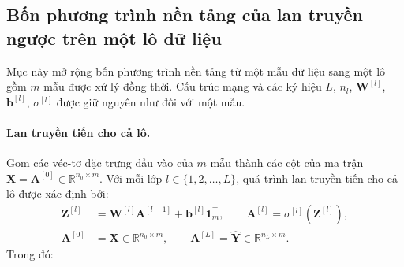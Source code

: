 \subsection{Bốn phương trình nền tảng của lan truyền ngược trên một lô dữ liệu}
Mục này mở rộng bốn phương trình nền tảng từ một mẫu dữ liệu sang một lô gồm $m$ mẫu được xử lý đồng thời. Cấu trúc mạng và các ký hiệu $L$, $n_l$, $\mathbf{W}^{[l]}$, $\mathbf{b}^{[l]}$, $\sigma^{[l]}$ được giữ nguyên như đối với một mẫu. 
 
\paragraph{Lan truyền tiến cho cả lô.\\}
Gom các véc-tơ đặc trưng đầu vào của $m$ mẫu thành các cột của ma trận $\mathbf{X} = \mathbf{A}^{[0]} \in \mathbb{R}^{n_0 \times m}$. Với mỗi lớp $l \in \{1,2,\dots,L\}$, quá trình lan truyền tiến cho cả lô được xác định bởi:
\begin{equation}
\label{eq:bpb_forward}
\begin{aligned}
\mathbf{Z}^{[l]} &= \mathbf{W}^{[l]}\mathbf{A}^{[l-1]} + \mathbf{b}^{[l]}\mathbf{1}_m^{\top}, \qquad \mathbf{A}^{[l]} = \sigma^{[l]}\!\left(\mathbf{Z}^{[l]}\right), \\
\mathbf{A}^{[0]} &= \mathbf{X} \in \mathbb{R}^{n_0 \times m}, \qquad \mathbf{A}^{[L]} = \widehat{\mathbf{Y}} \in \mathbb{R}^{n_L \times m}.
\end{aligned}
\end{equation}
Trong đó:
